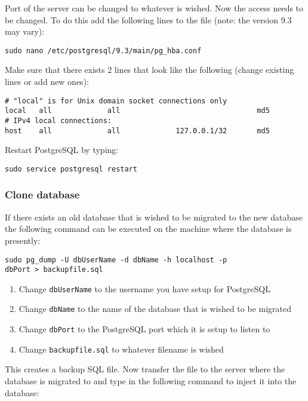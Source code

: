 Port of the server can be changed to whatever is wished. Now the access needs to be changed. To do this add the following lines to the file (note: the version 9.3 may vary): 
\begin{verbatim}
sudo nano /etc/postgresql/9.3/main/pg_hba.conf
\end{verbatim}
Make sure that there exists 2 lines that look like the following (change existing lines or add new ones):
\begin{verbatim}
# "local" is for Unix domain socket connections only
local   all             all                                md5
# IPv4 local connections:
host    all             all             127.0.0.1/32       md5
\end{verbatim}
Restart PostgreSQL by typing:
\begin{verbatim}
sudo service postgresql restart
\end{verbatim}


\subsubsection{Clone database}
If there exists an old database that is wished to be migrated to the new database the following command can be executed on the machine where the database is presently:

\begin{verbatim}
sudo pg_dump -U dbUserName -d dbName -h localhost -p
dbPort > backupfile.sql
\end{verbatim}
\begin{enumerate}
\item Change \verb+dbUserName+ to the username you have setup for PostgreSQL
\item Change \verb+dbName+ to the name of the database that is wished to be migrated
\item Change \verb+dbPort+ to the PostgreSQL port which it is setup to listen to
\item Change \verb+backupfile.sql+ to whatever filename is wished
\end{enumerate}

This creates a backup SQL file. Now transfer the file to the server where the database is migrated to and type in the following command to inject it into the database:

